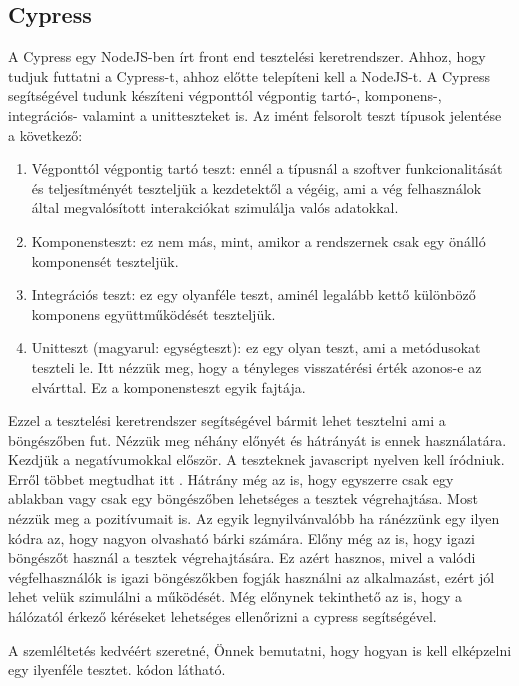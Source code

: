\documentclass[]{thesis-ekf}
\theoremstyle{definition}
\theoremstyle{remark}
\begin{document}
	\subsection{Cypress}
		A Cypress egy NodeJS-ben írt front end tesztelési keretrendszer. Ahhoz, hogy tudjuk futtatni a Cypress-t, ahhoz előtte telepíteni kell a NodeJS-t. A Cypress segítségével tudunk készíteni végponttól végpontig tartó-, komponens-, integrációs- valamint a unitteszteket is.
		Az imént felsorolt teszt típusok jelentése a következő:
		\begin{enumerate}
			\item Végponttól végpontig tartó teszt: ennél a típusnál a szoftver funkcionalitását és teljesítményét teszteljük a kezdetektől a végéig, ami a vég felhasználok által megvalósított interakciókat szimulálja valós adatokkal.
			\item Komponensteszt: ez nem más, mint, amikor a rendszernek csak egy önálló komponensét teszteljük.
			\item Integrációs teszt: ez egy olyanféle teszt, aminél legalább kettő különböző komponens együttműködését teszteljük.
			\item Unitteszt (magyarul: egységteszt): ez egy olyan teszt, ami a metódusokat teszteli le. Itt nézzük meg, hogy a tényleges visszatérési érték azonos-e az elvárttal. Ez a komponensteszt egyik fajtája.
		\end{enumerate}
		Ezzel a tesztelési keretrendszer segítségével bármit lehet tesztelni ami a böngészőben fut. Nézzük meg néhány előnyét és hátrányát is ennek használatára. Kezdjük a negatívumokkal először. A teszteknek javascript nyelven kell íródniuk. Erről többet megtudhat itt . Hátrány még az is, hogy egyszerre csak egy ablakban vagy csak egy böngészőben lehetséges a tesztek végrehajtása. Most nézzük meg a pozitívumait is. Az egyik legnyilvánvalóbb ha ránézzünk egy ilyen kódra az, hogy nagyon olvasható bárki számára. Előny még az is, hogy igazi böngészőt használ a tesztek végrehajtására. Ez azért hasznos, mivel a valódi végfelhasználók is igazi böngészőkben fogják használni az alkalmazást, ezért jól lehet velük szimulálni a működését. Még előnynek tekinthető az is, hogy a hálózatól érkező kéréseket lehetséges ellenőrizni a cypress segítségével.
		\cite{Cypress, Kusper Szoftvertesztles, Katalon,Medium}
		
		A szemléltetés kedvéért szeretné, Önnek bemutatni, hogy hogyan is kell elképzelni egy ilyenféle tesztet.  kódon látható.
		
		
		
\end{document}
